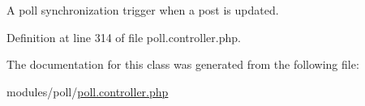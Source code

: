 A poll synchronization trigger when a post is updated. 



Definition at line 314 of file poll.\-controller.\-php.



The documentation for this class was generated from the following file\-:\begin{DoxyCompactItemize}
\item 
modules/poll/\hyperlink{poll_8controller_8php}{poll.\-controller.\-php}\end{DoxyCompactItemize}
